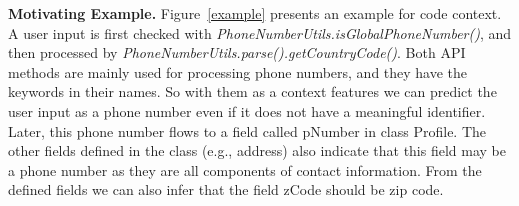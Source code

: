 \textbf{Motivating Example.} Figure~\ref{example} presents an example for code context. A user input is first checked with \textit{PhoneNumberUtils.isGlobalPhoneNumber()}, and then processed by \textit{PhoneNumberUtils.parse().getCountryCode()}. Both API methods are mainly used for processing phone numbers, and they have the keywords in their names. So with them as a context features we can predict the user input as a phone number even if it does not have a meaningful identifier. Later, this phone number flows to a field called pNumber in class Profile. The other fields defined in the class (e.g., address) also indicate that this field may be a phone number as they are all components of contact information. From the defined fields we can also infer that the field zCode should be zip code.


